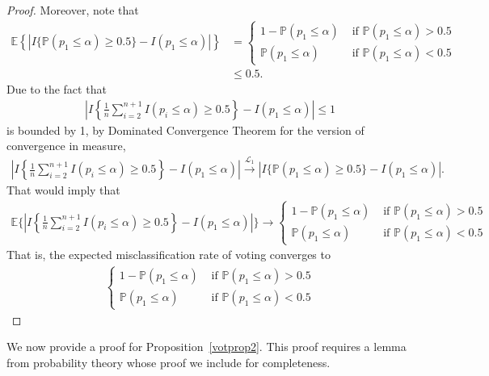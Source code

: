 \documentclass[11pt]{article}
\def\E{\mathbb{E}} %
\def\P{\mathbb{P}}
\theoremstyle{definition}
\begin{document}
\begin{proof}
Moreover, note that
\begin{align*}
\E \left\{ |I\{ \P(p_1 \leq  \alpha) \geq 0.5\}
  - I( p_1 \leq  \alpha) |\right\}
  & = \begin{cases}
    1- \P(p_1 \leq \alpha) & \text{ if } \P(p_1 \leq \alpha) > 0.5 \\
    \P(p_1 \leq \alpha) & \text{ if } \P(p_1 \leq \alpha) < 0.5 
  \end{cases} \\
  & \leq  0.5.
\end{align*}
Due to the fact that
\begin{align*}
 \left|I\left\{\frac{1}{n}\sum_{i=2}^{n+1}I(p_i \leq  \alpha) \geq 0.5\right\}
  - I( p_1 \leq  \alpha) \right| \leq 1
\end{align*}
is bounded by 1, by Dominated Convergence Theorem for the version of convergence in measure,
\begin{align*}
 \left|I\left\{\frac{1}{n}\sum_{i=2}^{n+1}I(p_i \leq  \alpha) \geq 0.5\right\}
  - I( p_1 \leq  \alpha) \right|
  \stackrel{\mathcal{L}_1}{\rightarrow}  |I\{ \P(p_1 \leq  \alpha) \geq 0.5\}
  - I( p_1 \leq  \alpha) |.
\end{align*}
That would imply that 
\begin{align*}
  \E \bigg\{\left|I\left\{\frac{1}{n}\sum_{i=2}^{n+1}I(p_i \leq  \alpha) \geq 0.5\right\}
  - I( p_1 \leq  \alpha) \right|\bigg\}
  \to  \begin{cases}
    1- \P(p_1 \leq \alpha) & \text{ if } \P(p_1 \leq \alpha) > 0.5 \\
    \P(p_1 \leq \alpha) & \text{ if } \P(p_1 \leq \alpha) < 0.5 
  \end{cases}
\end{align*}
That is, the expected misclassification rate of voting converges to 
\begin{align*}
  \begin{cases}
    1- \P(p_1 \leq \alpha) & \text{ if } \P(p_1 \leq \alpha) > 0.5 \\
    \P(p_1 \leq \alpha) & \text{ if } \P(p_1 \leq \alpha) < 0.5 
  \end{cases}
\end{align*}
\end{proof}


We now provide a proof for Proposition~\ref{votprop2}. This proof requires a lemma from probability theory whose proof we include for completeness.
\end{document}
